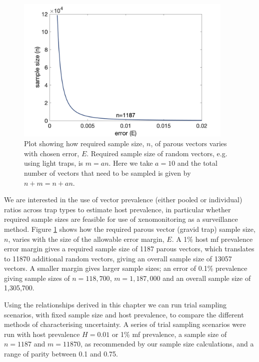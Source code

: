 \begin{figure}[h]
\begin{center}
\includegraphics[height=7cm]{Project/Figures/Xeno/VaryError.png}
\end{center}
\caption{Plot showing how required sample size, $n$, of parous vectors varies with chosen error, $E$. Required sample size of random vectors, e.g. using light traps, is $m=an$. Here we take $a=10$ and the total number of vectors that need to be sampled is given by $n + m = n+an$.}
\label{fig:error}
\end{figure}

We are interested in the use of vector prevalence (either pooled or individual) ratios across trap types to estimate host prevalence, in particular whether required sample sizes are feasible for use of xenomonitoring as a surveillance method. Figure \ref{fig:error} shows how the required parous vector (gravid trap) sample size, $n$, varies with the size of the allowable error margin, $E$. A 1\% host mf prevalence error margin gives a required sample size of 1187 parous vectors, which translates to 11870 additional random vectors, giving an overall sample size of 13057 vectors. A smaller margin gives larger sample sizes; an error of 0.1\% prevalence giving sample sizes of $n=118,700$, $m=1,187,000$ and an overall sample size of 1,305,700.

\FloatBarrier

Using the relationships derived in this chapter we can run trial sampling scenarios, with fixed sample size and host prevalence, to compare the different methods of characterising uncertainty. A series of trial sampling scenarios were run with host prevalence $H=0.01$ or 1\% mf prevalence, a sample size of $n=1187$ and $m=11870$, as recommended by our sample size calculations, and a range of parity between 0.1 and 0.75. 

